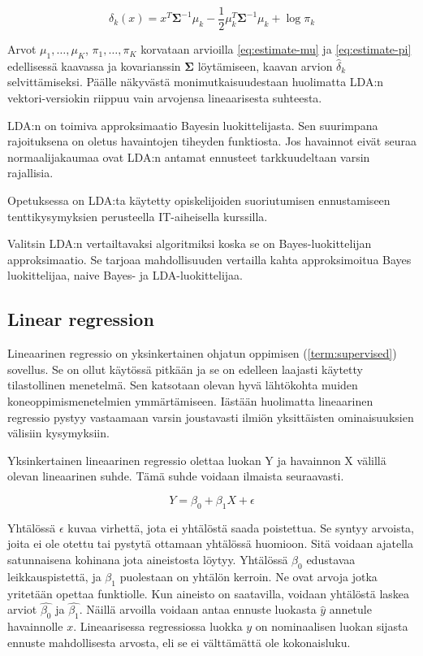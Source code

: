 \documentclass[finnish,twoside,openright]{HYgraduMLDS}
\begin{document}
\begin{equation}
    \delta_k(x) = x^T \pmb{\Sigma}^{-1} \mu_k - \frac{1}{2} \mu_k^T \pmb{\Sigma}^{-1} \mu_k + \log \pi_k
\end{equation}

Arvot $\mu_1, \dots, \mu_K$, $\pi_1, \dots, \pi_K$ korvataan arvioilla \ref{eq:estimate-mu} ja \ref{eq:estimate-pi} edellisessä kaavassa ja kovarianssin $\pmb{\Sigma}$ löytämiseen, kaavan arvion $\hat{\delta}_k$ selvittämiseksi. Päälle näkyvästä monimutkaisuudestaan huolimatta LDA:n vektori-versiokin riippuu vain arvojensa lineaarisesta suhteesta.

LDA:n on toimiva approksimaatio Bayesin luokittelijasta\cite{james2013ISLR}. Sen suurimpana rajoituksena on oletus havaintojen tiheyden funktiosta. Jos havainnot eivät seuraa normaalijakaumaa ovat LDA:n antamat ennusteet tarkkuudeltaan varsin rajallisia.

Opetuksessa on LDA:ta käytetty opiskelijoiden suoriutumisen ennustamiseen tenttikysymyksien perusteella\cite{7265316} IT-aiheisella kurssilla. 

Valitsin LDA:n vertailtavaksi algoritmiksi koska se on Bayes-luokittelijan approksimaatio. Se tarjoaa mahdollisuuden vertailla kahta approksimoitua Bayes luokittelijaa, naive Bayes- ja LDA-luokittelijaa.


\subsection{Linear regression}

Lineaarinen regressio on yksinkertainen ohjatun oppimisen (\ref{term:supervised}) sovellus\cite{james2013ISLR}. Se on ollut käytössä pitkään ja se on edelleen laajasti käytetty tilastollinen menetelmä. Sen katsotaan olevan hyvä lähtökohta muiden koneoppimismenetelmien ymmärtämiseen. Iästään huolimatta lineaarinen regressio pystyy vastaamaan varsin joustavasti ilmiön yksittäisten ominaisuuksien välisiin kysymyksiin. 

Yksinkertainen lineaarinen regressio olettaa luokan Y ja havainnon X välillä olevan lineaarinen suhde. Tämä suhde voidaan ilmaista seuraavasti. 

\begin{equation} \label{eq:1}
    Y = \beta_0 + \beta_1 X + \epsilon
\end{equation}

Yhtälössä $\epsilon$ kuvaa virhettä, jota ei yhtälöstä saada poistettua. Se syntyy arvoista, joita ei ole otettu tai pystytä ottamaan yhtälössä huomioon. Sitä voidaan ajatella satunnaisena kohinana jota aineistosta löytyy. Yhtälössä $\beta_0$ edustavaa leikkauspistettä, ja $\beta_1$ puolestaan on yhtälön kerroin. Ne ovat arvoja jotka yritetään opettaa funktiolle. Kun aineisto on saatavilla, voidaan yhtälöstä laskea arviot $\hat{\beta_0}$ ja $\hat{\beta_1}$. Näillä arvoilla voidaan antaa ennuste luokasta $\hat{y}$ annetule havainnolle $x$. Lineaarisessa regressiossa luokka $y$ on nominaalisen luokan sijasta ennuste mahdollisesta arvosta, eli se ei välttämättä ole kokonaisluku.
\end{document}
